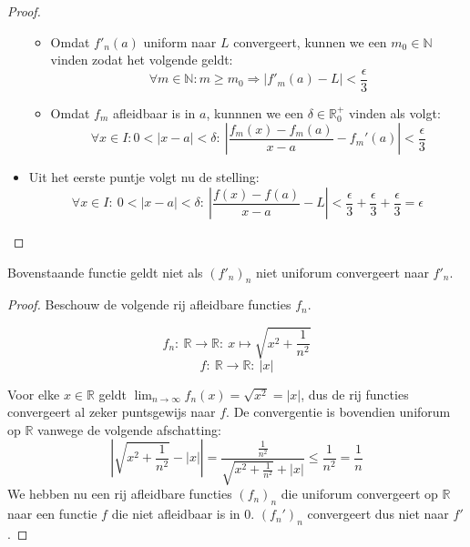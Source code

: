 \documentclass[main.tex]{subfiles}
\begin{document}
\begin{bst}
\begin{proof}
\begin{itemize}
\begin{itemize}
      \item 
        Omdat $f'_{n}(a)$ uniform naar $L$ convergeert, kunnen we een $m_{0} \in \mathbb{N}$ vinden zodat het volgende geldt:
        \[ \forall m\in \mathbb{N}: m \ge m_{0} \Rightarrow \left| f'_{m}(a) - L \right| < \frac{\epsilon}{3}\]
      \item 
        Omdat $f_{m}$ afleidbaar is in $a$, kunnnen we een $\delta \in \mathbb{R}_{0}^{+}$ vinden  als volgt:
        \[ \forall x\in I: 0 < |x-a| < \delta:\ \left| \frac{f_{m}(x)-f_{m}(a)}{x-a} - f_{m}'(a) \right| < \frac{\epsilon}{3} \]
      \end{itemize}
    \item Uit het eerste puntje volgt nu de stelling:
      \[ \forall x\in I:\ 0 < |x-a| < \delta:\ \left| \frac{f(x)-f(a)}{x-a} - L \right|  < \frac{\epsilon}{3}+\frac{\epsilon}{3} +\frac{\epsilon}{3} = \epsilon \]
    \end{itemize}
  \end{proof}
\end{bst}

\begin{tvb}
  Bovenstaande functie geldt niet als $(f'_{n})_{n}$ niet uniforum convergeert naar $f'_{n}$.
  \begin{proof}
    Beschouw de volgende rij afleidbare functies $f_{n}$.

    \noindent
    \begin{minipage}{.45\textwidth}
    \begin{figure}[H]
      \centering
    \end{figure}
    \end{minipage}
    \begin{minipage}{.45\textwidth}
    \[ f_{n}:\ \mathbb{R} \rightarrow \mathbb{R}:\ x \mapsto \sqrt{x^{2}+ \frac{1}{n^{2}}} \]
    \[ f:\ \mathbb{R} \rightarrow \mathbb{R}:\ |x| \]
    \end{minipage}
    Voor elke $x\in \mathbb{R}$ geldt $\lim_{n\rightarrow \infty}f_{n}(x) = \sqrt{x^{2}} = |x|$, dus de rij functies convergeert al zeker puntsgewijs naar $f$.
    De convergentie is bovendien uniforum op $\mathbb{R}$ vanwege de volgende afschatting:
    \[
    \left| \sqrt{x^{2}+\frac{1}{n^{2}}} - |x| \right|
    = \frac{\frac{1}{n^{2}}}{\sqrt{x^{2}+\frac{1}{n^{2}}} + |x|}
    \le \frac{1}{n^{2}}
    = \frac{1}{n}
    \]
    We hebben nu een rij afleidbare functies $(f_{n})_{n}$ die uniforum convergeert op $\mathbb{R}$ naar een functie $f$ die niet afleidbaar is in $0$.
    $(f_{n}')_{n}$ convergeert dus niet naar $f'$.
  \end{proof}
\end{tvb}
\end{document}

